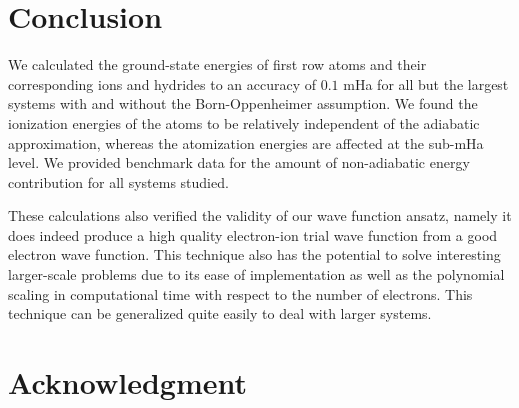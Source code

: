 \documentclass[pra,superscriptaddress,groupedaddress,twocolumn]{revtex4}
\begin{document}
\section{Conclusion}
We calculated the ground-state energies of first row atoms and their corresponding ions and hydrides to an accuracy of $0.1$ mHa for all but the largest systems with and without the Born-Oppenheimer assumption. We found the ionization energies of the atoms to be relatively independent of the adiabatic approximation, whereas the atomization energies are affected at the sub-mHa level. We provided benchmark data for the amount of non-adiabatic energy contribution for all systems studied. %

These calculations also verified the validity of our wave function ansatz, namely it does indeed produce a high quality electron-ion trial wave function from a good electron wave function. This technique also has the potential to solve interesting larger-scale problems due to its ease of implementation as well as the polynomial scaling in computational time with respect to the number of electrons.  This technique can be generalized quite easily to deal with larger systems.

\section{Acknowledgment}



\end{document}
